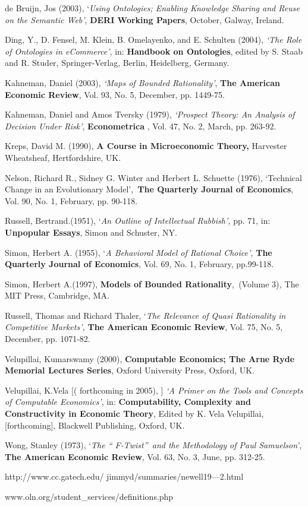 \documentclass{ucthesis}
\begin{document}
\begin{thebibliography}{99}
 de Bruijn, Jos (2003), `\textit{Using Ontologies;
Enabling Knowledge Sharing and Reuse on the Semantic Web'}, \textbf{DERI
Working Papers}, October, Galway, Ireland.

 Ding, Y., D. Fensel, M. Klein, B. Omelayenko, and
E. Schulten (2004), \textit{`The Role of Ontologies in eCommerce'}, in: 
\textbf{Handbook on Ontologies}, edited by S. Staab and R. Studer,
Springer-Verlag, Berlin, Heidelberg, Germany.

 Kahneman, Daniel (2003), \textit{`Maps of Bounded
Rationality'}, \textbf{The American Economic Review}, Vol. 93, No. 5,
December, pp. 1449-75.

 Kahneman, Daniel and Amos Tversky (1979), \textit{%
`Prospect Theory: An Analysis of Decision Under Risk'}, \textbf{Econometrica}%
, Vol. 47, No. 2, March, pp. 263-92.

 Kreps, David M. (1990), \textbf{A Course in
Microeconomic Theory,} Harvester Wheatsheaf, Hertfordshire, UK.

 Nelson, Richard R., Sidney G. Winter and Herbert L. Schuette
(1976), `Technical Change in an Evolutionary Model',\textit{\ }\textbf{The
Quarterly Journal of Economics}, Vol. 90, No. 1, February, pp. 90-118.

 Russell, Bertrand.(1951), `\textit{An Outline of
Intellectual Rubbish',} pp. 71, in: \textbf{Unpopular Essays}, Simon and
Schuster, NY.

 Simon, Herbert A. (1955), `\textit{A Behavioral Model
of Rational Choice',} \textbf{The Quarterly Journal of Economics}, Vol. 69,
No. 1, February, pp.99-118.

 Simon, Herbert A.(1997), \textbf{Models of Bounded
Rationality},\textit{\ }(Volume 3)\textit{,} The MIT Press, Cambridge, MA.

 Russell, Thomas and Richard Thaler, `\textit{The Relevance
of Quasi Rationality in Competitive Markets',} \textbf{The American Economic
Review}, Vol. 75, No. 5, December, pp. 1071-82.

 Velupillai, Kumarswamy (2000), \textbf{Computable
Economics; The Arne Ryde Memorial Lectures Series}, Oxford University Press,
Oxford, UK.

 Velupillai, K.Vela {\LARGE [}( forthcoming in 2005),%
{\LARGE ]} \textit{`A Primer on the Tools and Concepts of Computable
Economics'}, in: \textbf{Computability, Complexity and Constructivity in
Economic Theory}, Edited by K. Vela Velupillai, {\LARGE [forthcoming],}%
Blackwell Publishing, Oxford, UK.

 Wong, Stanley (1973), `\textit{The \textquotedblleft
F-Twist\textquotedblright\ and the Methodology of Paul Samuelson',} \textbf{%
The American Economic Review}, Vol. 63, No. 3, June, pp. 312-25.

 http://www.cc.gatech.edu/%
jimmyd/summaries/newell19---2.html

 www.oln.org/student\_services/definitions.php
\end{thebibliography}
\end{document}
